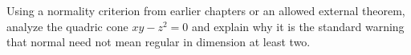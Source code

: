 \begin{problem}
Using a normality criterion from earlier chapters or an allowed external theorem, analyze the quadric cone $xy-z^2=0$ and explain why it is the standard warning that normal need not mean regular in dimension at least two.
\end{problem}
